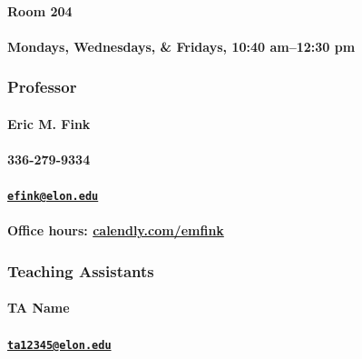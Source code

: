 \documentclass[11pt,letterpaper,twoside]{article}
\begin{document}
\paragraph*{Room 204}\label{section-3}

\paragraph*{Mondays, Wednesdays, \& Fridays, 10:40 am--12:30
pm}\label{section-4}

\subsubsection*{Professor}\label{professor}

\paragraph*{Eric M. Fink}\label{section-5}

\paragraph*{336-279-9334}\label{section-6}

\paragraph*{\texorpdfstring{\href{mailto:efink@elon.edu}{\nolinkurl{efink@elon.edu}}}{efink@elon.edu}}\label{section-7}

\paragraph*{\texorpdfstring{Office hours:
{\href{https://calendly.com/emfink/}{calendly.com/emfink}}}{Office hours: calendly.com/emfink}}\label{office-hours-calendly.comemfink}

\subsubsection*{Teaching Assistants}\label{teaching-assistants}

\paragraph*{TA Name}\label{section-8}

\paragraph*{\texorpdfstring{\href{mailto:ta12345@elon.edu}{\nolinkurl{ta12345@elon.edu}}}{ta12345@elon.edu}}\label{section-9}
\end{document}
